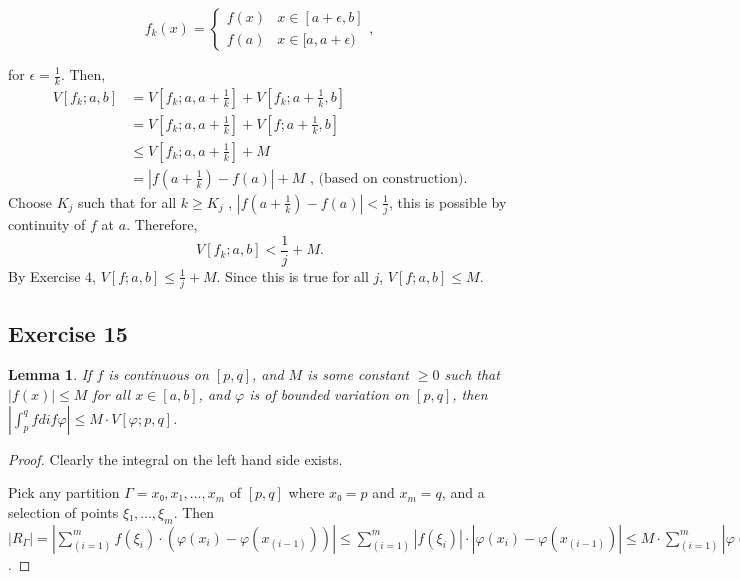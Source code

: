 \documentclass{article}
\newtheorem{lemma}{Lemma}
\begin{document}
\begin{comment}
    -- khanh
    f being continuous at a might be deduced directly from "S_{\overline{\Gamma}}&=|f(x_{1})-f(a)|+\sum_{i=2}^{m}|f(x_{i})-f(x_{i-1})|"
    no need to make a sequence f_k
\end{comment}

\[
f_{k}(x)=\begin{cases}
    f(x) & x\in[a+\epsilon,b] \\
    f(a) & x\in[a,a+\epsilon)
\end{cases},
\]

\begin{comment}
    -- khanh
    f(x) = f(x) ?
    maybe what you meant is f_k(x) = f(x)
\end{comment}


for $\epsilon=\frac{1}{k}$.
Then,
\begin{align*}
    V[f_{k};a,b]&=V\left[f_{k};a,a+\frac{1}{k}\right]+V\left[f_{k};a+\frac{1}{k},b\right] \\
    &=V\left[f_{k};a,a+\frac{1}{k}\right]+V\left[f;a+\frac{1}{k},b\right] \\
    &\leq V\left[f_{k};a,a+\frac{1}{k}\right]+M \\
    &= \left|f\left(a+\frac{1}{k}\right)-f(a)\right|+M \mbox{ , (based on construction).}
\end{align*}
Choose $K_{j}$ such that for all $k\geq K_{j}$
, $|f(a+\frac{1}{k})-f(a)|<\frac{1}{j}$, this is possible
by continuity of $f$ at $a$. Therefore,
\[
V[f_{k};a,b]<\frac{1}{j}+M.
\]
By Exercise $4$, $V[f;a,b]\leq\frac{1}{j}+M$. Since this is true for all $j$, $V[f;a,b]\leq M$.
\fi

\subsection{Exercise 15}%

\typstmathinputenable{\$}
\begin{lemma}
    If $f$ is continuous on $[p, q]$, and $M$ is some constant $≥0$ such that $|f(x)|≤ M$ for all $x ∈[a, b]$, and $φ$ is of bounded variation on $[p, q]$, then $|∫_p^q f dif φ| ≤ M ⋅ V[φ; p, q]$.
\end{lemma}
\begin{proof}
    Clearly the integral on the left hand side exists.

    Pick any partition $Γ={x₀, x₁, …, x_m}$ of $[p, q]$ where $x₀=p$ and $x_m=q$, and a selection of points $ξ₁, …, ξ_m$. Then $|R_Γ| = |∑_(i=1)^m f(ξ_i) ⋅ (φ(x_i) - φ(x_(i-1)))| ≤ ∑_(i=1)^m |f(ξ_i)| ⋅ |φ(x_i) - φ(x_(i-1))| ≤ M ⋅ ∑_(i=1)^m |φ(x_i)-φ(x_(i-1))| ≤ M ⋅ V[φ; p, q]$.
\end{proof}
\end{document}
